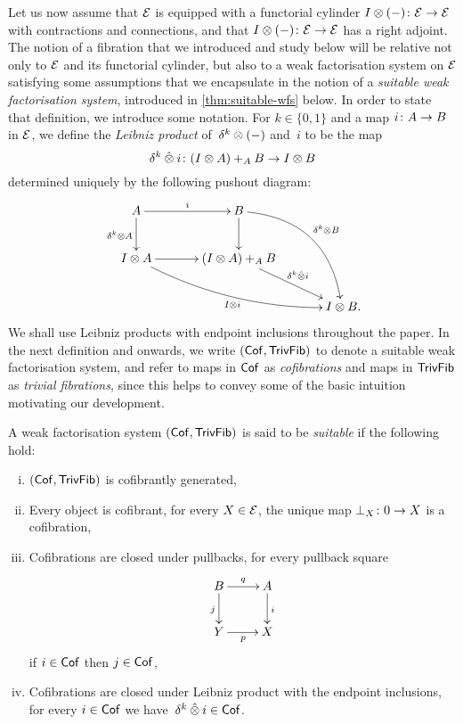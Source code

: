 \documentclass[reqno,10pt,a4paper,oneside,draft]{amsart}
\begin{document}
Let us now assume that $\catE$ is equipped with a functorial cylinder $\interval\otimes (-) \co \catE \to \catE$ with contractions and connections, and that 
$\interval\otimes (-) \co \catE \to \catE$ has a right adjoint. 
The notion of a fibration that we introduced and study below will be relative not only to $\cal{E}$ and its functorial cylinder,
but also to a weak factorisation system on $\cal{E}$ satisfying some assumptions that we encapsulate in the notion of a \emph{suitable
weak factorisation system}, introduced in \cref{thm:suitable-wfs} below. In order to state that definition, we introduce some notation.  
For $k \in \{ 0, 1\}$ and a map $i \co A \to B$ in $\catE$, we define the \emph{Leibniz product} of~$\kcyl \otimes (-)$ and~$i$ to be the map 
\[
\kcyl \hatotimes i \co (\interval \otimes A) +_A B \to \interval \otimes B
\] 
determined uniquely by the following pushout diagram:
\begin{gather*}
\xymatrix@C=1.2cm{
  A
  \ar[r]^{i}
  \ar[d]_{\kcyl \otimes A}
&
  B
  \ar@/^2pc/[ddr]^{\kcyl \otimes B}
  \ar[d]
&\\
  \interval \otimes A
  \ar@/_1pc/[drr]_{\interval \otimes i}
  \ar[r]
&
  (\interval \otimes A) +_A B
  \ar[dr]^-{\delta^k \hatotimes i}
&\\&&
  \interval \otimes B
\rlap{.}}
\end{gather*}
We shall use Leibniz products with endpoint inclusions throughout the paper. In the next definition and onwards, we write
$(\Cof, \TrivFib)$ to denote a suitable weak factorisation system, and refer to maps in $\Cof$ as \emph{cofibrations} and maps in 
$\TrivFib$ as \emph{trivial fibrations}, since this helps to convey some of the basic intuition motivating our development. 


\begin{definition} \label{thm:suitable-wfs} A weak factorisation system $(\Cof, \TrivFib)$ is said to be \emph{suitable} if the following hold:
\begin{enumerate}[(i)]
 \item $(\Cof, \TrivFib)$  is cofibrantly generated,
\item Every object is cofibrant, \ie for every $X \in \cal{E}$, the unique map $\bot_X \co 0 \to X$ is a cofibration, 
 \item Cofibrations are closed under pullbacks, \ie for every pullback square
\[
\xymatrix{
B \ar[d]_j \ar[r]^q & A \ar[d]^i \\
Y \ar[r]_p & X }
\]
if $i \in \Cof$ then $j \in \Cof$, 
\item Cofibrations are closed under Leibniz product with the endpoint inclusions, \ie for every $i \in \Cof$ we 
have~$\kcyl \hatotimes i \in \Cof$.
\end{enumerate}
\end{definition}
\end{document}
